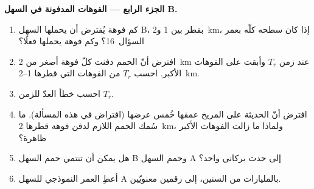 \begin{problem}
\medskip\noindent\textbf{الجزء الرابع --- الفوهات المدفونة في السهل B.}
\begin{enumerate}[resume]
\item كم فوهة يُفترض أن يحملها السهل B، بقطر بين 1 و\qty{2}{km}، إذا كان سطحه كلّه بعمر السؤال~16؟
  وكم فوهة يحملها فعلًا؟
\item افترض أنّ الحمم دفنت كلّ فوهة أصغر من \qty{2}{km} عند زمن $T_r$
  وأبقت على الفوهات الأكبر. احسب $T_r$ من الفوهات
  التي قطرها \num{1}--\qty{2}{km}.
\item احسب خطأ العدّ للزمن $T_r$.
\item افترض أنّ  الحديثة على المريخ عمقها خُمس عرضها
  (افتراض في هذه المسألة). ما سُمك الحمم اللازم لدفن
  فوهة قطرها \qty{2}{km}، ولماذا ما زالت الفوهات الأكبر ظاهرة؟
\item هل يمكن أن تنتمي حمم السهل B وحمم السهل A إلى حدث
  بركاني واحد؟
\item أعطِ العمر النموذجي للسهل A بالمليارات من السنين، إلى
  رقمين معنويّين.
\end{enumerate}
\end{problem}
